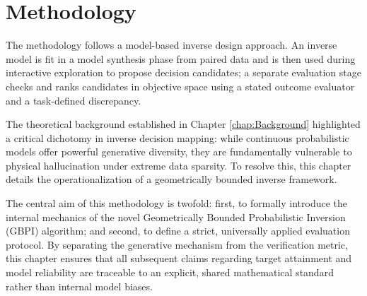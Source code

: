 
\chapter{Methodology}\label{chap:methodology}

The methodology follows a model-based inverse design approach. An inverse model is
fit in a model synthesis phase from paired data and is then used during interactive
exploration to propose decision candidates; a separate evaluation stage checks and ranks
candidates in objective space using a stated outcome evaluator and a task-defined discrepancy.


The theoretical background established in Chapter \ref{chap:Background} highlighted a critical dichotomy in inverse decision mapping: while continuous probabilistic models offer powerful generative diversity, they are fundamentally vulnerable to physical hallucination under extreme data sparsity. To resolve this, this chapter details the operationalization of a geometrically bounded inverse framework. 

The central aim of this methodology is twofold: first, to formally introduce the internal mechanics of the novel Geometrically Bounded Probabilistic Inversion (GBPI) algorithm; and second, to define a strict, universally applied evaluation protocol. By separating the generative mechanism from the verification metric, this chapter ensures that all subsequent claims regarding target attainment and model reliability are traceable to an explicit, shared mathematical standard rather than internal model biases.



